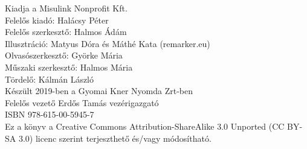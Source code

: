    
\clearpage\null\vfill
\pagestyle{empty}
\begin{minipage}[b]{0.9\textwidth}
\footnotesize\raggedright
\setlength{\parskip}{0.5\baselineskip}
Kiadja a Misulink Nonprofit Kft.\\
Felelős kiadó: Halácsy Péter \\
Felelős szerkesztő: Halmos Ádám \\
Illusztráció: Matyus Dóra és Máthé Kata (remarker.eu) \\
Olvasószerkesztő: Györke Mária \\
Műszaki szerkesztő: Halmos Mária \\
Tördelő: Kálmán László\\
Készült 2019-ben a Gyomai Kner Nyomda Zrt-ben \\
Felelős vezető Erdős Tamás  vezérigazgató \\
ISBN 978-615-00-5945-7\\
\smallskip
Ez a könyv a Creative Commons Attribution-ShareAlike 3.0 Unported (CC BY-SA 3.0) licenc szerint terjeszthető és/vagy módosítható.
\end{minipage}
\vspace*{2\baselineskip}
\cleardoublepage

